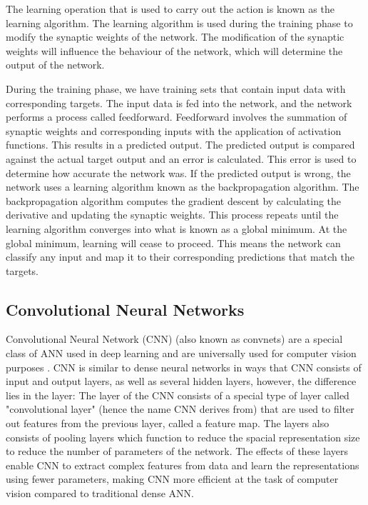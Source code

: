 The learning operation that is used to carry out the action is known as the learning algorithm. The learning algorithm is used during the training phase to modify the synaptic weights of the network. The modification of the synaptic weights will influence the behaviour of the network, which will determine the output of the network.



During the training phase, we have training sets that contain input data with corresponding targets. The input data is fed into the network, and the network performs a process called feedforward. Feedforward involves the summation of synaptic weights and corresponding inputs with the application of activation functions. This results in a predicted output. The predicted output is compared against the actual target output and an error is calculated. This error is used to determine how accurate the network was. If the predicted output is wrong, the network uses a learning algorithm known as the backpropagation algorithm. The backpropagation algorithm computes the gradient descent by calculating the derivative and updating the synaptic weights. This process repeats until the learning algorithm converges into what is known as a global minimum. At the global minimum, learning will cease to proceed. This means the network can classify any input and map it to their corresponding predictions that match the targets.




\subsection{Convolutional Neural Networks}
Convolutional Neural Network (CNN) (also known as convnets) are a special class of ANN used in deep learning and are universally used for computer vision purposes \cite{enwiki:1085146109}. CNN is similar to dense neural networks in ways that CNN consists of input and output layers, as well as several hidden layers, however, the difference lies in the layer: The layer of the CNN consists of a special type of layer called "convolutional layer" (hence the name CNN derives from) that are used to filter out features from the previous layer, called a feature map. The layers also consists of pooling layers which function to reduce the spacial representation size to reduce the number of parameters of the network. The effects of these layers enable CNN to extract complex features from data and learn the representations using fewer parameters, making CNN more efficient at the task of computer vision compared to traditional dense ANN. 

